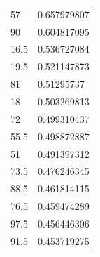 \begin{longtable}{|l|l|}
	\rowcolor[HTML]{F8FF00} 
	57                                                      & 0.657979807                                                   \\
	\rowcolor[HTML]{F8FF00} 
	90                                                      & 0.604817095                                                   \\
	\rowcolor[HTML]{F8FF00} 
	16.5                                                    & 0.536727084                                                   \\
	\rowcolor[HTML]{F8FF00} 
	19.5                                                    & 0.521147873                                                   \\
	\rowcolor[HTML]{F8FF00} 
	81                                                      & 0.51295737                                                    \\
	\rowcolor[HTML]{F8FF00} 
	18                                                      & 0.503269813                                                   \\
	\rowcolor[HTML]{F8FF00} 
	72                                                      & 0.499310437                                                   \\
	\rowcolor[HTML]{F8FF00} 
	55.5                                                    & 0.498872887                                                   \\
	\rowcolor[HTML]{F8FF00} 
	51                                                      & 0.491397312                                                   \\
	\rowcolor[HTML]{F8FF00} 
	73.5                                                    & 0.476246345                                                   \\
	\rowcolor[HTML]{F8FF00} 
	88.5                                                    & 0.461814115                                                   \\
	\rowcolor[HTML]{F8FF00} 
	76.5                                                    & 0.459474289                                                   \\
	\rowcolor[HTML]{F8FF00} 
	97.5                                                    & 0.456446306                                                   \\
	\rowcolor[HTML]{F8FF00} 
	91.5                                                    & 0.453719275                                                   \\

\end{longtable}
